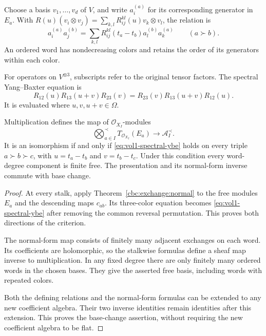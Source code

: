 Choose a basis $v_1,\ldots,v_d$ of $V$, and write $a_i^{(a)}$ for its
corresponding generator in $E_a$.  With
$R(u)(v_i\otimes v_j)=\sum_{k,l}R_{ij}^{kl}(u)v_k\otimes v_l$, the relation is
\begin{equation}\label{eq:vol1-zf}
 a_i^{(a)}a_j^{(b)}
 =\sum_{k,l}R_{ij}^{kl}(t_a-t_b)a_l^{(b)}a_k^{(a)}
 \qquad(a\succ b).
\end{equation}
An ordered word has nondecreasing colors and retains the order of its
generators within each color.

For operators on $V^{\otimes3}$, subscripts refer to the original tensor
factors.  The spectral Yang--Baxter equation is
\begin{equation}\label{eq:vol1-spectral-ybe}
 R_{12}(u)R_{13}(u+v)R_{23}(v)
 =R_{23}(v)R_{13}(u+v)R_{12}(u).
\end{equation}
It is evaluated where $u,v,u+v\in\Omega$.

\begin{proposition}\label{cbc:spectral:family}
Multiplication defines the map of $\mathcal O_{X_I}$-modules
\begin{equation}\label{cbc:spectral:ordered}
 \bigotimes_{a\in I}^{\prec}T_{\mathcal O_{X_I}}(E_a)
 \longrightarrow\mathcal A_I^{\prec}.
\end{equation}
It is an isomorphism if and only if \eqref{eq:vol1-spectral-ybe} holds on every triple
$a\succ b\succ c$, with $u=t_a-t_b$ and $v=t_b-t_c$.
Under this condition every word-degree component is finite free.
The presentation and its normal-form inverse commute with base change.
\end{proposition}
\begin{proof}
At every stalk, apply Theorem~\ref{cbc:exchange:normal} to the free modules
$E_a$ and the descending maps $c_{ab}$.  Its three-color equation becomes
\eqref{eq:vol1-spectral-ybe} after removing the common reversal permutation.
This proves both directions of the criterion.

The normal-form map consists of finitely many adjacent exchanges on each
word.  Its coefficients are holomorphic, so the stalkwise formulas define
a sheaf map inverse to multiplication.  In any fixed degree there are
only finitely many ordered words in the chosen bases.  They give the
asserted free basis, including words with repeated colors.

Both the defining relations and the normal-form formulas can be extended
to any new coefficient algebra.  Their two inverse identities remain
identities after this extension.  This proves the base-change assertion,
without requiring the new coefficient algebra to be flat.
\end{proof}

